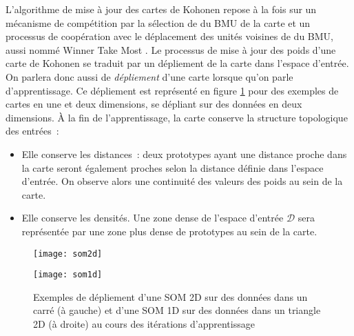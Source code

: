 \documentclass[../main]{subfiles}
\begin{document}
L'algorithme de mise à jour des cartes de Kohonen repose à la fois sur un mécanisme de compétition par la sélection de du BMU de la carte et un processus de coopération avec le déplacement des unités voisines de du BMU, aussi nommé \og Winner Take Most \fg{}.
Le processus de mise à jour des poids d'une carte de Kohonen se traduit par un dépliement de la carte dans l'espace d'entrée. On parlera donc aussi de \emph{dépliement} d'une carte lorsque qu'on parle d'apprentissage. Ce dépliement est représenté en figure \ref{fig:som1d} pour des exemples de cartes en une et deux dimensions, se dépliant sur des données en deux dimensions.
\`A la fin de l'apprentissage, la carte conserve la structure topologique des entrées~:
\begin{itemize}
\item Elle conserve les distances~: deux prototypes ayant une distance proche dans la carte seront également proches selon la distance définie dans l'espace d'entrée. On observe alors une continuité des valeurs des poids au sein de la carte.
\item Elle conserve les densités. Une zone dense de l'espace d'entrée $\mathcal{D}$ sera représentée par une zone plus dense de prototypes au sein de la carte.
\end{itemize}
\begin{figure}
    \begin{minipage}{0.5\textwidth}
    \centering
    \texttt{[image: som2d]}
    \end{minipage}
    \begin{minipage}{0.5\textwidth}
    \centering
    \texttt{[image: som1d]}
    \end{minipage}
    \caption{Exemples de dépliement d'une SOM 2D sur des données dans un carré (à gauche) et d'une SOM 1D sur des données dans un triangle 2D (à droite) au cours des itérations d'apprentissage \parencite{Kohonen1995SelfOrganizingM}\label{fig:som1d}}
    \end{figure}
\end{document}
